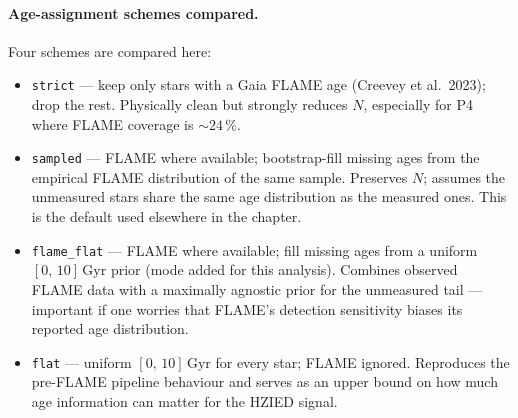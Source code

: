 \paragraph{Age-assignment schemes compared.}
Four schemes are compared here:
\begin{itemize}
    \item \texttt{strict} --- keep only stars with a Gaia FLAME age
    (Creevey et al.\ 2023); drop the rest.  Physically clean but
    strongly reduces $N$, especially for P4 where FLAME coverage is
    ${\sim}24\,\%$.
    \item \texttt{sampled} --- FLAME where available; bootstrap-fill
    missing ages from the empirical FLAME distribution of the same
    sample.  Preserves $N$; assumes the unmeasured stars share the
    same age distribution as the measured ones.  This is the default
    used elsewhere in the chapter.
    \item \texttt{flame\_flat} --- FLAME where available; fill missing
    ages from a uniform $[0,\,10]\,\mathrm{Gyr}$ prior (mode added
    for this analysis).  Combines observed FLAME data with a
    maximally agnostic prior for the unmeasured tail --- important
    if one worries that FLAME's detection sensitivity biases its
    reported age distribution.
    \item \texttt{flat} --- uniform $[0,\,10]\,\mathrm{Gyr}$ for every
    star; FLAME ignored.  Reproduces the pre-FLAME pipeline
    behaviour and serves as an upper bound on how much age
    information can matter for the HZIED signal.
\end{itemize}

